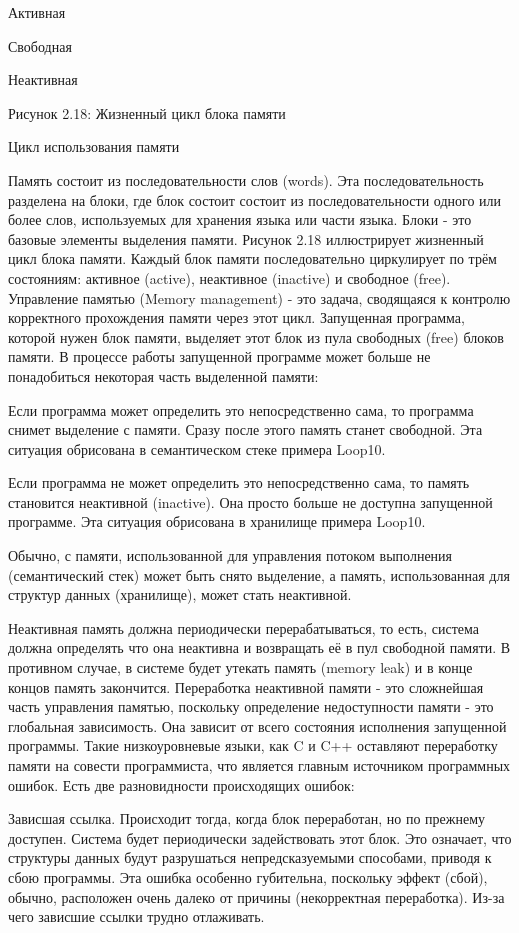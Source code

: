 Активная

Свободная

Неактивная

Рисунок 2.18: Жизненный цикл блока памяти

Цикл использования памяти

Память состоит из последовательности слов (words). Эта последовательность разделена на блоки, где блок состоит состоит из последовательности одного или более слов, используемых для хранения языка или части языка. Блоки - это базовые элементы выделения памяти. Рисунок 2.18 иллюстрирует жизненный цикл блока памяти. Каждый блок памяти последовательно циркулирует по трём состояниям: активное (active), неактивное (inactive) и свободное (free). Управление памятью (Memory management) - это задача, сводящаяся к контролю корректного прохождения памяти через этот цикл. Запущенная программа, которой нужен блок памяти, выделяет этот блок из пула свободных (free) блоков памяти. В процессе работы запущенной программе может больше не понадобиться некоторая часть выделенной памяти:

Если программа может определить это непосредственно сама, то программа снимет выделение с памяти. Сразу после этого память станет свободной. Эта ситуация обрисована в семантическом стеке примера Loop10.

Если программа не может определить это непосредственно сама, то память становится неактивной (inactive). Она просто больше не доступна запущенной программе. Эта ситуация обрисована в хранилище примера Loop10.

Обычно, с памяти, использованной для управления потоком выполнения (семантический стек) может быть снято выделение, а память, использованная для структур данных (хранилище), может стать неактивной.

Неактивная память должна периодически перерабатываться, то есть, система должна определять что она неактивна и возвращать её в пул свободной памяти. В противном случае, в системе будет утекать память (memory leak) и в конце концов память закончится. Переработка неактивной памяти - это сложнейшая часть управления памятью, поскольку определение недоступности памяти - это глобальная зависимость. Она зависит от всего состояния исполнения запущенной программы. Такие низкоуровневые языки, как C и C++ оставляют переработку памяти на совести программиста, что является главным источником программных ошибок. Есть две разновидности происходящих ошибок:

Зависшая ссылка. Происходит тогда, когда блок переработан, но по прежнему доступен. Система будет периодически задействовать этот блок. Это означает, что структуры данных будут разрушаться непредсказуемыми способами, приводя к сбою программы. Эта ошибка особенно губительна, поскольку эффект (сбой), обычно, расположен очень далеко от причины (некорректная переработка). Из-за чего зависшие ссылки трудно отлаживать.

